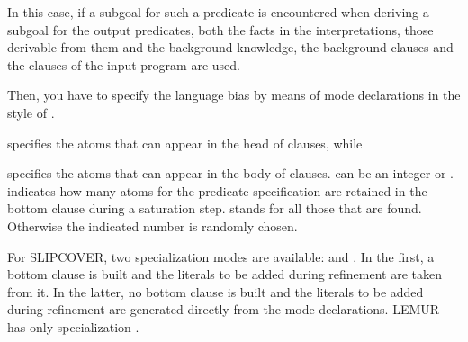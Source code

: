 \documentclass[letterpaper,10pt,english]{sphinxmanual}
\begin{document}
\sphinxAtStartPar
In this case, if a subgoal for such a predicate is encountered when deriving a subgoal for the output predicates, both the facts in the interpretations, those derivable from them and the background knowledge, the background clauses and the clauses of the input program are used.

\sphinxAtStartPar
Then, you have to specify the language bias by means of mode declarations in the style of .

\begin{sphinxVerbatim}[commandchars=\\\{\}]
\end{sphinxVerbatim}

\sphinxAtStartPar
specifies the atoms that can appear in the head of clauses, while

\begin{sphinxVerbatim}[commandchars=\\\{\}]
\end{sphinxVerbatim}

\sphinxAtStartPar
specifies the atoms that can appear in the body of clauses.  can be an integer or \sphinxcode{\sphinxupquote{*}}.  indicates how many atoms for the predicate specification are retained in the bottom clause during a saturation step. \sphinxcode{\sphinxupquote{*}} stands for all those that are found.
Otherwise the indicated number is randomly chosen.

\sphinxAtStartPar
For SLIPCOVER, two specialization modes are available:  and . In the first, a bottom clause is built and the literals to be added during refinement are taken from it. In the latter, no bottom clause is built and the literals to be added during refinement are generated directly from the mode declarations. LEMUR has only specialization .
\end{document}
